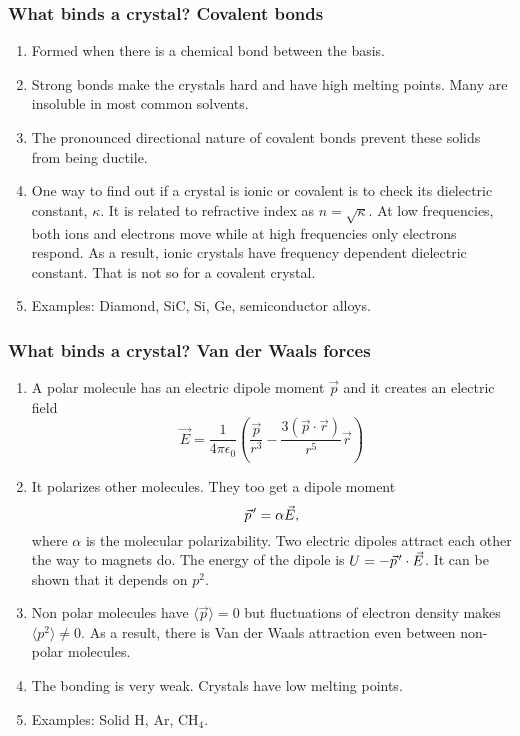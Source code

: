\documentclass{beamer}
\newcommand{\pvec}[1]{\vec{#1}\mkern2mu\vphantom{#1}}
\begin{document}
\begin{frame}
\frametitle{What binds a crystal? Covalent bonds}
\begin{enumerate}
\item Formed when there is a chemical bond between the basis.
\item Strong bonds make the crystals hard and have high melting points. Many are
insoluble in most common solvents.
\item The pronounced directional nature of covalent bonds prevent these solids
from being ductile.
\item One way to find out if a crystal is ionic or covalent is to check its
dielectric constant, $\kappa$. It is related to refractive index as $n = 
\sqrt{\kappa}$. At low frequencies, both ions and electrons move while at high
frequencies only electrons respond. As a result, ionic crystals have frequency
dependent dielectric constant. That is not so for a covalent crystal.
\item Examples: Diamond, SiC, Si, Ge, semiconductor alloys.
\end{enumerate}
\end{frame}

\begin{frame}
\frametitle{What binds a crystal? Van der Waals forces}
\begin{enumerate}
\item A polar molecule has an electric dipole moment $\vec{p}$ and it creates an
electric field
\begin{equation}\label{e1}
\vec{E} = \frac{1}{4\pi\epsilon_0}
\left(\frac{\vec{p}}{r^3}-\frac{3(\vec{p}\cdot\vec{r})}{r^5}\vec{r}\right)
\end{equation}
\item It polarizes other molecules. They too get a dipole moment
\begin{equation}\label{e2}
\pvec{p}^\prime = \alpha \vec{E},
\end{equation}
where $\alpha$ is the molecular polarizability. Two electric dipoles attract 
each other the way to magnets do. The energy of the dipole is $U = 
-\pvec{p}^\prime \cdot \vec{E}$. It can be shown that it depends on $p^2$.
\item Non polar molecules have $\langle\vec{p}\rangle = 0$ but fluctuations of
electron density makes $\langle p^2 \rangle \ne 0$. As a result, there is Van
der Waals attraction even between non-polar molecules.
\item The bonding is very weak. Crystals have low melting points.
\item Examples: Solid H, Ar, CH$_{4}$.
\end{enumerate}
\end{frame}
\end{document}
